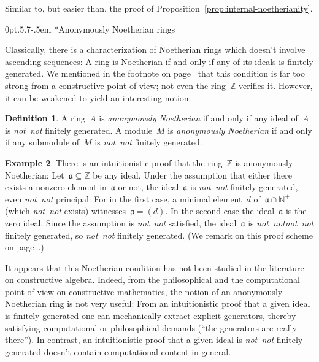 \documentclass[10pt,reqno,a4paper]{amsbook}
\makeatletter
\theoremstyle{definition}
\newtheorem{defn}{Definition}[section]
\newtheorem{ex}[defn]{Example}
\theoremstyle{plain}
\theoremstyle{remark}
\newcommand{\ZZ}{\mathbb{Z}}
\newcommand{\NN}{\mathbb{N}}
\newcommand{\aaa}{\mathfrak{a}}
\newcommand{\?}{\,{:}\,}
\renewcommand{\_}{\mathpunct{.}\,}
\newcommand{\notnot}{\emph{not~not}\xspace}
\renewenvironment{proof}[1][\proofname]{\par
  \pushQED{\qed}%
  \normalfont \topsep6\p@\@plus6\p@\relax
  \trivlist
  \item[\hskip\labelsep
        \itshape
    #1\@addpunct{.}]\ignorespaces
}{%
  \popQED\endtrivlist\@endpefalse
}
\def\subsection{\@startsection{subsection}{2}%
  {0pt}{.5\linespacing\@plus.7\linespacing}{-.5em}%
  {\normalfont\bfseries}}
\makeatother
\begin{document}
{\begin{proof}Similar to, but easier than, the proof of
Proposition~\ref{prop:internal-noetherianity}.
\end{proof}



\subsection*{Anonymously Noetherian rings}

Classically, there is a characterization of Noetherian rings which doesn't
involve ascending sequences: A ring is Noetherian if and only if any of its
ideals is finitely generated. We mentioned in the footnote on
page~\pageref{fn:z-principal-ideal-domain} that this condition is far too
strong from a constructive point of view; not even the ring~$\ZZ$ verifies it.
However, it can be weakened to yield an interesting notion:

\begin{defn}A ring~$A$ is \emph{anonymously Noetherian} if and only if any ideal
of~$A$ is \notnot finitely generated. A module~$M$ is \emph{anonymously Noetherian}
if and only if any submodule of~$M$ is \notnot finitely generated.\end{defn}

\begin{ex}There is an intuitionistic proof that the ring~$\ZZ$ is anonymously
Noetherian: Let~$\aaa \subseteq \ZZ$ be any ideal. Under the assumption that
either there exists a nonzero element in~$\aaa$ or not, the ideal~$\aaa$ is
\notnot finitely generated, even \notnot principal: For in the first case, a
minimal element~$d$ of~$\aaa \cap \NN^+$ (which \notnot exists) witnesses~$\aaa
= (d)$. In the second case the ideal~$\aaa$ is the zero ideal. Since the
assumption is \notnot satisfied, the ideal~$\aaa$ is \notnot \notnot finitely
generated, so \notnot finitely generated. (We remark on this proof scheme on
page~\pageref{proof-scheme-boxed-statements}.) \end{ex}

It appears that this Noetherian condition has not been studied in the
literature on constructive algebra. Indeed, from the philosophical and the
computational point of view on constructive mathematics, the notion of an anonymously
Noetherian ring is not very useful: From an intuitionistic proof that a given
ideal is finitely generated one can mechanically extract explicit generators,
thereby satisfying computational or philosophical demands (``the generators are
really there''). In contrast, an intuitionistic proof that a given ideal is
\notnot finitely generated doesn't contain computational content in general.

}
\end{document}
